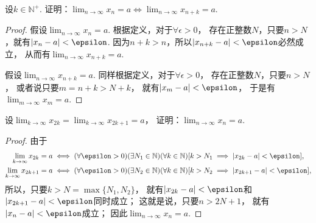 \begin{example}
设\(k\in\mathbb{N}^+\).
证明：\(\lim_{n\to\infty} x_n = a \iff \lim_{n\to\infty} x_{n+k} = a\).
\begin{proof}
假设\(\lim_{n\to\infty} x_n = a\).
根据定义，对于\(\forall\epsilon>0\)，
存在正整数\(N\)，只要\(n>N\)，就有\(\abs{x_n-a}<\epsilon\).
因为\(n+k>n\)，所以\(\abs{x_{n+k}-a}<\epsilon\)必然成立，
从而有\(\lim_{n\to\infty} x_{n+k} = a\).

假设\(\lim_{n\to\infty} x_{n+k} = a\).
同样根据定义，对于\(\forall\epsilon>0\)，
存在正整数\(N\)，只要\(n>N\)，
或者说只要\(m=n+k>N+k\)，
就有\(\abs{x_m-a}<\epsilon\)，
于是有\(\lim_{m\to\infty} x_m = a\).
\end{proof}
\end{example}

\begin{example}
设\(\lim_{k\to\infty} x_{2k} = \lim_{k\to\infty} x_{2k+1} = a\)，
证明：\(\lim_{n\to\infty} x_n = a\).
\begin{proof}
由于\begin{gather*}
	\lim_{k\to\infty} x_{2k} = a
	\iff
	(\forall\epsilon>0)
	(\exists N_1\in\mathbb{N})
	(\forall k\in\mathbb{N})
	[
		k>N_1
		\implies
		\abs{x_{2k}-a}<\epsilon
	], \\
	\lim_{k\to\infty} x_{2k+1} = a
	\iff
	(\forall\epsilon>0)
	(\exists N_2\in\mathbb{N})
	(\forall k\in\mathbb{N})
	[
		k>N_2
		\implies
		\abs{x_{2k+1}-a}<\epsilon
	],
\end{gather*}
所以，只要\(k>N=\max\{N_1,N_2\}\)，
就有\(\abs{x_{2k}-a}<\epsilon\)和\(\abs{x_{2k+1}-a}<\epsilon\)同时成立；
这就是说，只要\(n>2N+1\)，
就有\(\abs{x_n-a}<\epsilon\)成立；
因此\(\lim_{n\to\infty} x_n = a\).
\end{proof}
\end{example}
